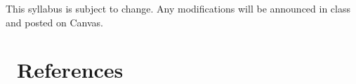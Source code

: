 \documentclass[11pt,letterpaper]{article}
\begin{document}
\vspace{1cm}

\begin{center}
    \color{lightgray}\small
    This syllabus is subject to change. Any modifications will be announced in class and posted on Canvas.
\end{center}

\clearpage
{}
\section*{\faBook\ References}
\printbibliography[heading=none]
\end{document}
